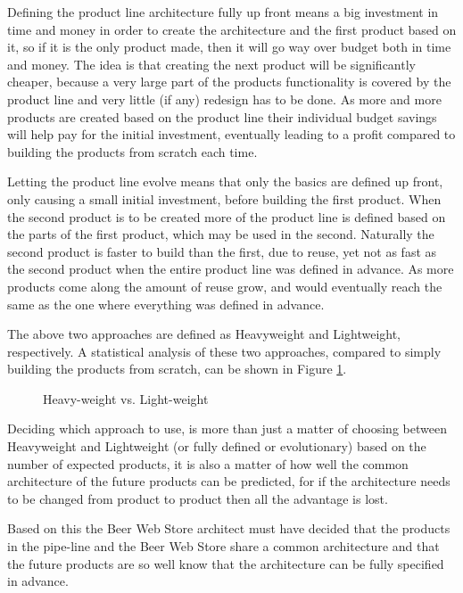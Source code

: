 Defining the product line architecture fully up front means a big investment in time and money in order to create the architecture and the first product based on it, so if it is the only product made, then it will go way over budget both in time and money. The idea is that creating the next product will be significantly cheaper, because a very large part of the products functionality is covered by the product line and very little (if any) redesign has to be done. As more and more products are created based on the product line their individual budget savings will help pay for the initial investment, eventually leading to a profit compared to building the products from scratch each time.

Letting the product line evolve means that only the basics are defined up front, only causing a small initial investment, before building the first product. When the second product is to be created more of the product line is defined based on the parts of the first product, which may be used in the second. Naturally the second product is faster to build than the first, due to reuse, yet not as fast as the second product when the entire product line was defined in advance. As more products come along the amount of reuse grow, and would eventually reach the same as the one where everything was defined in advance.

The above two approaches are defined as Heavyweight and Lightweight, respectively. A statistical analysis of these two approaches, compared to simply building the products from scratch, can be shown in Figure \ref{fig:product-line}.

\clearpage

\begin{figure}[!htb]
\centerline{}
\caption{Heavy-weight vs. Light-weight}
\label{fig:product-line}
\end{figure}

Deciding which approach to use, is more than just a matter of choosing between Heavyweight and Lightweight (or fully defined or evolutionary) based on the number of expected products, it is also a matter of how well the common architecture of the future products can be predicted, for if the architecture needs to be changed from product to product then all the advantage is lost.

Based on this the Beer Web Store architect must have decided that the products in the pipe-line and the Beer Web Store share a common architecture and that the future products are so well know that the architecture can be fully specified in advance.

